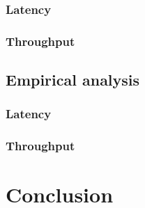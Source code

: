 \documentclass[a4paper]{article}
\begin{document}

\subsubsection*{Latency}

\subsubsection*{Throughput}

\subsection{Empirical analysis}

\subsubsection*{Latency}

\subsubsection*{Throughput}

\section*{Conclusion}
\end{document}
